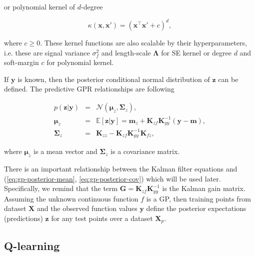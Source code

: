 \documentclass{ifacconf}
\begin{document}
\noindent or polynomial kernel of $d$-degree

\[
\kappa(\mathbf{x},\mathbf{x}')=\left(\mathbf{x}^{\top}\mathbf{x}'+c\right)^{d},
\]

\noindent where $c\geq0$. These kernel functions are also scalable
by their hyperparameters, i.e. these are signal variance $\sigma_{f}^{2}$
and length-scale $\mathbf{\Lambda}$ for SE kernel or degree $d$
and soft-margin $c$ for polynomial kernel.

If $\mathbf{y}$ is known, then the posterior conditional normal distribution
of $\mathbf{z}$ can be defined. The predictive GPR relationships
are following

\begin{eqnarray}
p(\mathbf{z}|\mathbf{y}) & = & \mathcal{N}(\boldsymbol{\mu}_{z},\mathbf{\Sigma}_{z}),\nonumber \\
\boldsymbol{\mu}_{z} & = & \mathbb{E}\left[\mathbf{z}|\mathbf{y}\right]=\mathbf{m}_{z}+\mathbf{K}_{zf}\mathbf{K}_{yy}^{-1}(\mathbf{y}-\mathbf{m}),\label{eq:gp-posterior-mean}\\
\mathbf{\Sigma}_{z} & = & \mathbf{K}_{zz}-\mathbf{K}_{zf}\mathbf{K}_{yy}^{-1}\mathbf{K}_{fz},\label{eq:gp-posterior-cov}
\end{eqnarray}

\noindent where $\boldsymbol{\mu}_{z}$ is a mean vector and $\mathbf{\Sigma}_{z}$
is a covariance matrix.

There is an important relationship between the Kalman filter equations
and (\ref{eq:gp-posterior-mean}, \ref{eq:gp-posterior-cov}) which
will be used later. Specifically, we remind that the term $\mathbf{G}=\mathbf{K}_{zf}\mathbf{K}_{yy}^{-1}$
is the Kalman gain matrix. Assuming the unknown continuous function
$f$ is a GP, then training points from dataset $\mathbf{X}$ and
the observed function values $\mathbf{y}$ define the posterior expectations
(predictions) $\mathbf{z}$ for any test points over a dataset $\mathbf{X}_{p}$.

\subsection{Q-learning}
\label{sec:Q-Learning}
\end{document}
